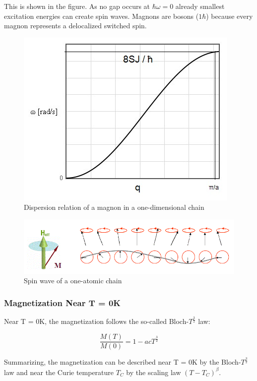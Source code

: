 \documentclass[10pt]{article} %
\begin{document}
This is shown in the figure. As no gap occurs at $\hbar \omega = 0$ already smallest excitation energies can create spin waves. Magnons are bosons ($1\hbar$) because every magnon represents a delocalized switched spin.
\begin{figure}[H]
\begin{center}
\includegraphics[scale=0.5]{magnondispersion}
\caption{Dispersion relation of a magnon in a one-dimensional chain}
\end{center}
\end{figure}

\begin{figure}[H]
\begin{center}
\includegraphics[scale=0.6]{spinwave2}
\caption{Spin wave of a one-atomic chain}
\end{center}
\end{figure}

\subsubsection{Magnetization Near T = 0K}
Near T = 0K, the magnetization follows the so-called Bloch-$T^{\frac{3}{2}}$ law:

\begin{equation}
\frac{M(T)}{M(0)} = 1 - acT^{\frac{3}{2}}
\end{equation}






Summarizing, the magnetization can be described near T = 0K by the Bloch-$T^{\frac{3}{2}}$ law and near the Curie temperature $T_C$ by the scaling law $(T - T_C)^{\beta}$.
\end{document}
